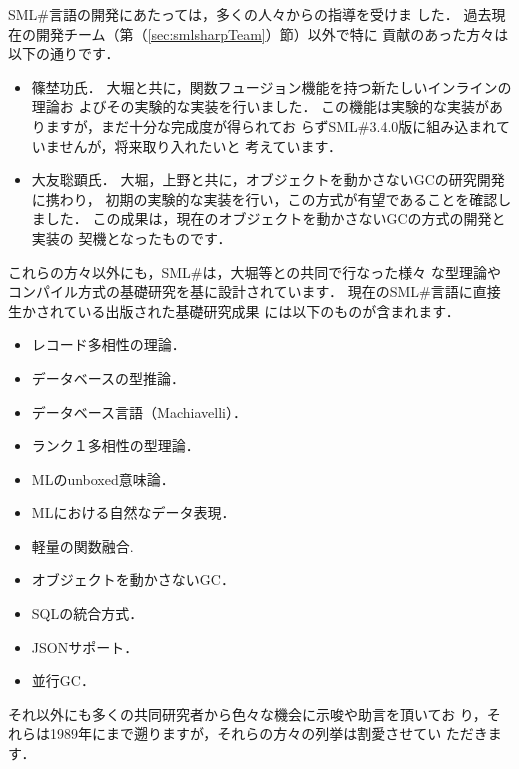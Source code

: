 \documentclass{jbook}
\newcommand{\smlsharp}{SML\#}
\newcommand{\version}{3.4.0}
\begin{document}
\ifjp%
	\smlsharp{}言語の開発にあたっては，多くの人々からの指導を受けま
した．
	過去現在の開発チーム（第（\ref{sec:smlsharpTeam}）節）以外で特に
貢献のあった方々は以下の通りです．
\begin{itemize}
\item 篠埜功氏．
	大堀と共に，関数フュージョン機能を持つ新たしいインラインの理論お
よびその実験的な実装を行いました．
	この機能は実験的な実装がありますが，まだ十分な完成度が得られてお
らず\smlsharp{}\version{}版に組み込まれていませんが，将来取り入れたいと
考えています．
\item 大友聡顕氏．
	大堀，上野と共に，オブジェクトを動かさないGCの研究開発に携わり，
初期の実験的な実装を行い，この方式が有望であることを確認しました．
	この成果は，現在のオブジェクトを動かさないGCの方式の開発と実装の
契機となったものです．
\end{itemize}
	これらの方々以外にも，\smlsharp{}は，大堀等との共同で行なった様々
な型理論やコンパイル方式の基礎研究を基に設計されています．
	現在の\smlsharp{}言語に直接生かされている出版された基礎研究成果
には以下のものが含まれます．
\begin{itemize}
\item レコード多相性の理論\cite{ohor92popl,ohor95toplas}．
\item データベースの型推論\cite{ohor88lfp}．
\item データベース言語（Machiavelli）\cite{ohor89sigmod,bune96tods}．
\item ランク１多相性の型理論\cite{ohor99icfp}．
\item MLのunboxed意味論\cite{ohor97unbox}．
\item MLにおける自然なデータ表現\cite{nguyen06ppdp}．
\item 軽量の関数融合\cite{ohor07popl}.
\item オブジェクトを動かさないGC\cite{ueno11icfp}．
\item SQLの統合方式\cite{ohori11icfp}．
\item JSONサポート\cite{ohori16ecoop}．
\item 並行GC\cite{ueno16icfp}．
\end{itemize}
	それ以外にも多くの共同研究者から色々な機会に示唆や助言を頂いてお
り，それらは1989年にまで遡りますが，それらの方々の列挙は割愛させてい
ただきます．
\else%
\end{document}
